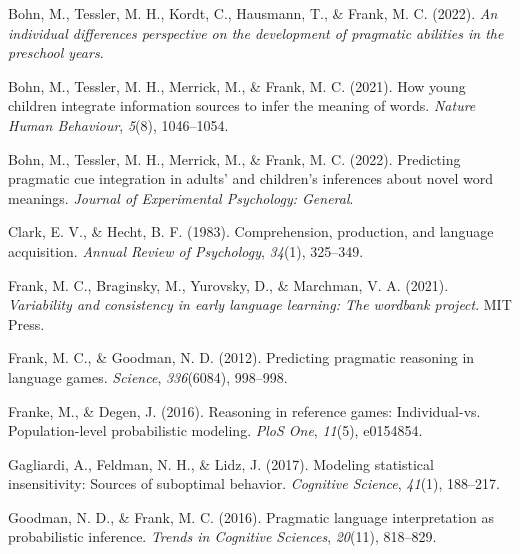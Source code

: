 \documentclass[
  man,floatsintext]{apa6}
\newlength{\cslhangindent}
\newlength{\cslentryspacingunit} %
\newenvironment{CSLReferences}[2] %
 {%
  \setlength{\parindent}{0pt}
  \ifodd #1
  \let\oldpar\par
  \def\par{\hangindent=\cslhangindent\oldpar}
  \fi
  \setlength{\parskip}{#2\cslentryspacingunit}
 }%
 {}
\begin{document}
\hypertarget{refs}{}
\begin{CSLReferences}{1}{0}
\leavevmode{}%
Bohn, M., Tessler, M. H., Kordt, C., Hausmann, T., \& Frank, M. C. (2022). \emph{An individual differences perspective on the development of pragmatic abilities in the preschool years}.

\leavevmode{}%
Bohn, M., Tessler, M. H., Merrick, M., \& Frank, M. C. (2021). How young children integrate information sources to infer the meaning of words. \emph{Nature Human Behaviour}, \emph{5}(8), 1046--1054.

\leavevmode{}%
Bohn, M., Tessler, M. H., Merrick, M., \& Frank, M. C. (2022). Predicting pragmatic cue integration in adults' and children's inferences about novel word meanings. \emph{Journal of Experimental Psychology: General}.

\leavevmode{}%
Clark, E. V., \& Hecht, B. F. (1983). Comprehension, production, and language acquisition. \emph{Annual Review of Psychology}, \emph{34}(1), 325--349.

\leavevmode{}%
Frank, M. C., Braginsky, M., Yurovsky, D., \& Marchman, V. A. (2021). \emph{Variability and consistency in early language learning: The wordbank project}. MIT Press.

\leavevmode{}%
Frank, M. C., \& Goodman, N. D. (2012). Predicting pragmatic reasoning in language games. \emph{Science}, \emph{336}(6084), 998--998.

\leavevmode{}%
Franke, M., \& Degen, J. (2016). Reasoning in reference games: Individual-vs. Population-level probabilistic modeling. \emph{PloS One}, \emph{11}(5), e0154854.

\leavevmode{}%
Gagliardi, A., Feldman, N. H., \& Lidz, J. (2017). Modeling statistical insensitivity: Sources of suboptimal behavior. \emph{Cognitive Science}, \emph{41}(1), 188--217.

\leavevmode{}%
Goodman, N. D., \& Frank, M. C. (2016). Pragmatic language interpretation as probabilistic inference. \emph{Trends in Cognitive Sciences}, \emph{20}(11), 818--829.


\end{CSLReferences}
\end{document}
